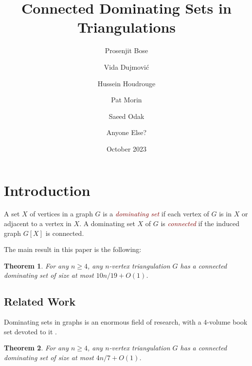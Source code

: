 \documentclass[12pt]{article}
\title{Connected Dominating Sets in Triangulations}
\author{Prosenjit Bose \and Vida Dujmović \and Hussein Houdrouge \and Pat Morin \and Saeed Odak \and Anyone Else?}
\date{October 2023}
\newtheorem{thm}{Theorem}
\newcommand{\defin}[1]{\emph{\textcolor{Maroon}{#1}}}
\newcommand{\pat}[1]{[\textcolor{red}{#1}]}
\begin{document}
\maketitle



\section{Introduction}

A set $X$ of vertices in a graph $G$ is a \defin{dominating set} if each vertex of $G$ is in $X$ or adjacent to a vertex in $X$.  A dominating set $X$ of $G$ is \defin{connected} if the induced graph $G[X]$ is connected.


The main result in this paper is the following:

\begin{thm}\label{main_result2}
  For any $n\ge 4$, any $n$-vertex triangulation $G$ has a connected dominating set of size at most $10n/19 + O(1)$.
\end{thm}

\subsection{Related Work}

Dominating sets in graphs is an enormous field of research, with a $4$-volume book set devoted to it \cite{haynes.hedetniemi:domination1}.




\begin{thm}\label{main_result}
  For any $n\ge 4$, any $n$-vertex triangulation $G$ has a connected dominating set of size at most $4n/7 + O(1)$.
\end{thm}
\end{document}
